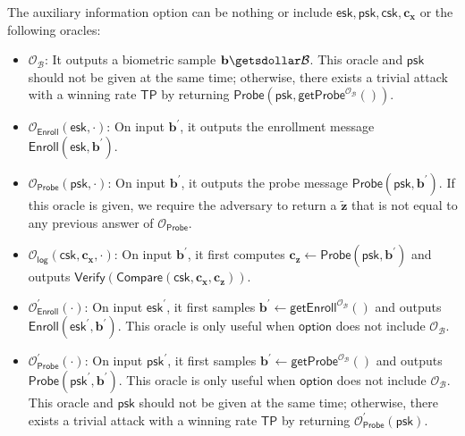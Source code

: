 The auxiliary information \textsf{option} can be nothing or include $\mathsf{esk}, \mathsf{psk}, \mathsf{csk}, \mathbf{c_x}$ or the following oracles:

\begin{itemize}

	\item $\mathcal{O}_{\mathcal{B}}$: It outputs a biometric sample $\mathbf{b} \getsdollar \mathcal{B}$. This oracle and $\mathsf{psk}$ should not be given at the same time; otherwise, there exists a trivial attack with a winning rate $\mathsf{TP}$ by returning $\mathsf{Probe}(\mathsf{psk}, \mathsf{getProbe}^{ \mathcal{O}_\mathcal{B} }() )$.
	
	\item $\mathcal{O}_{\mathsf{Enroll}}(\mathsf{esk}, \cdot)$: On input $\mathbf{b}^\prime$, it outputs the enrollment message $\mathsf{Enroll}(\mathsf{esk}, \mathbf{b}^\prime)$.

	\item $\mathcal{O}_{\mathsf{Probe}}(\mathsf{psk}, \cdot)$: On input $\mathbf{b}^\prime$, it outputs the probe message $\mathsf{Probe}(\mathsf{psk}, \mathbf{b}^\prime)$. If this oracle is given, we require the adversary to return a $\mathbf{\tilde{z}}$ that is not equal to any previous answer of $\mathcal{O}_\mathsf{Probe}$.
	
	\item $\mathcal{O}_\mathsf{log}(\mathsf{csk}, \mathbf{c_x}, \cdot)$: On input $\mathbf{b}^\prime$, it first computes $\mathbf{c_z} \gets \mathsf{Probe}(\mathsf{psk}, \mathbf{b}^\prime)$ and outputs $\mathsf{Verify}(\mathsf{Compare}(\mathsf{csk}, \mathbf{c_x}, \mathbf{c_z} ) )$.
	
	\item $\mathcal{O}_\textsf{Enroll}^\prime (\cdot)$: On input $\textsf{esk}^\prime$, it first samples $\mathbf{b}^\prime \gets \textsf{getEnroll}^{\mathcal{O}_{\mathcal{B}}}()$ and outputs $\textsf{Enroll}(\textsf{esk}^\prime, \mathbf{b}^\prime)$. This oracle is only useful when $\textsf{option}$ does not include $\mathcal{O}_{\mathcal{B}}$.

	\item $\mathcal{O}_\textsf{Probe}^\prime (\cdot)$: On input $\textsf{psk}^\prime$, it first samples $\mathbf{b}^\prime \gets \textsf{getProbe}^{\mathcal{O}_{\mathcal{B}}}()$ and outputs $\textsf{Probe}(\textsf{psk}^\prime, \mathbf{b}^\prime)$. This oracle is only useful when $\textsf{option}$ does not include $\mathcal{O}_{\mathcal{B}}$. This oracle and $\textsf{psk}$ should not be given at the same time; otherwise, there exists a trivial attack with a winning rate $\textsf{TP}$ by returning $\mathcal{O}_{\textsf{Probe}}^\prime (\textsf{psk})$.
	
\end{itemize}


